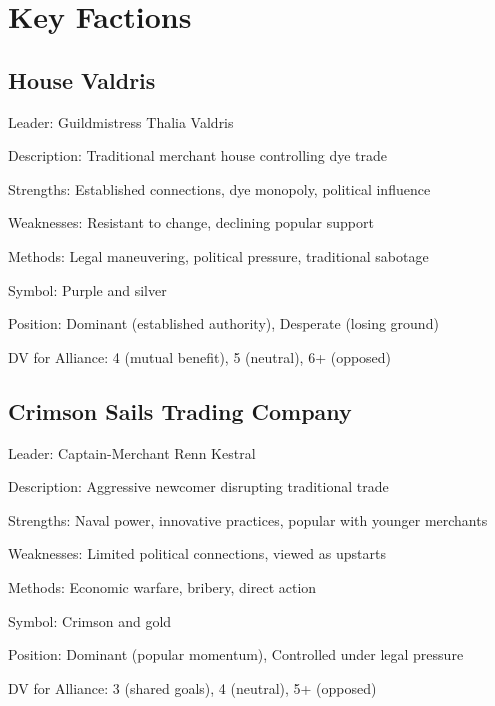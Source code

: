 \documentclass[11pt]{article}
\newenvironment{faction}[1]{\begin{description}[leftmargin=*,style=standard]\item[\textbf{#1}]}{\end{description}}
\begin{document}
\section{Key Factions}

\subsection{House Valdris}
\begin{faction}{House Valdris}
\item[Leader:] Guildmistress Thalia Valdris
\item[Description:] Traditional merchant house controlling dye trade
\item[Strengths:] Established connections, dye monopoly, political influence
\item[Weaknesses:] Resistant to change, declining popular support
\item[Methods:] Legal maneuvering, political pressure, traditional sabotage
\item[Symbol:] Purple and silver
\item[Position:] Dominant (established authority), Desperate (losing ground)
\item[DV for Alliance:] 4 (mutual benefit), 5 (neutral), 6+ (opposed)
\end{faction}

\subsection{Crimson Sails Trading Company}
\begin{faction}{Crimson Sails Trading Company}
\item[Leader:] Captain-Merchant Renn Kestral
\item[Description:] Aggressive newcomer disrupting traditional trade
\item[Strengths:] Naval power, innovative practices, popular with younger merchants
\item[Weaknesses:] Limited political connections, viewed as upstarts
\item[Methods:] Economic warfare, bribery, direct action
\item[Symbol:] Crimson and gold
\item[Position:] Dominant (popular momentum), Controlled under legal pressure
\item[DV for Alliance:] 3 (shared goals), 4 (neutral), 5+ (opposed)
\end{faction}
\end{document}

